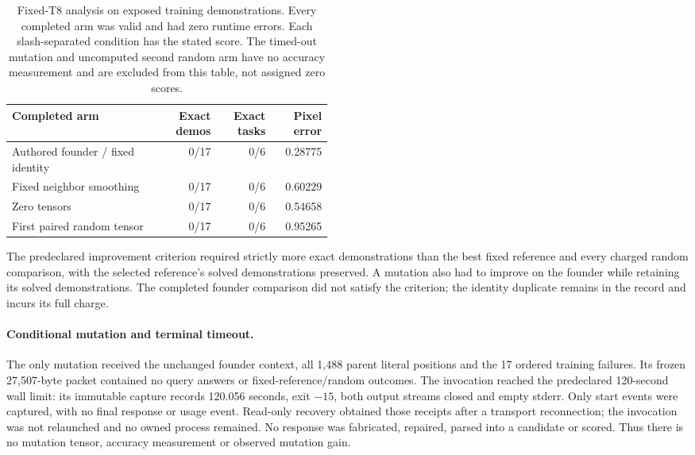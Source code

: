 \documentclass[11pt]{article}
\begin{document}
\begin{table}[!htbp]
\centering\small
\begin{tabular}{@{}p{0.47\linewidth}rrr@{}}
\toprule
Completed arm & Exact demos & Exact tasks & Pixel error\\
\midrule
Authored founder / fixed identity & 0/17 & 0/6 & 0.28775\\
Fixed neighbor smoothing & 0/17 & 0/6 & 0.60229\\
Zero tensors & 0/17 & 0/6 & 0.54658\\
First paired random tensor & 0/17 & 0/6 & 0.95265\\
\bottomrule
\end{tabular}
\caption{Fixed-T8 analysis on exposed training demonstrations. Every completed arm
was valid and had zero runtime errors. Each slash-separated condition has the
stated score. The timed-out mutation and uncomputed second random arm have no
accuracy measurement and are excluded from this table, not assigned zero scores.}
\label{tab:ncatranche}
\end{table}

The predeclared improvement criterion required strictly more exact demonstrations
than the best fixed reference and every charged random comparison, with the
selected reference's solved demonstrations preserved. A mutation also had to
improve on the founder while retaining its solved demonstrations. The completed
founder comparison did not satisfy the criterion; the identity duplicate remains
in the record and incurs its full charge.

\paragraph{Conditional mutation and terminal timeout.}
The only mutation received the unchanged founder context, all 1{,}488 parent
literal positions and the 17 ordered training failures. Its frozen 27{,}507-byte
packet contained no query answers or fixed-reference/random outcomes. The
invocation reached the predeclared 120-second wall limit: its immutable capture
records 120.056 seconds, exit $-15$, both output streams closed and empty stderr.
Only start events were captured, with no final response or usage event. Read-only
recovery obtained those receipts after a transport reconnection; the invocation
was not relaunched and no owned process remained. No response was fabricated,
repaired, parsed into a candidate or scored. Thus there is no mutation tensor,
accuracy measurement or observed mutation gain.
\end{document}
